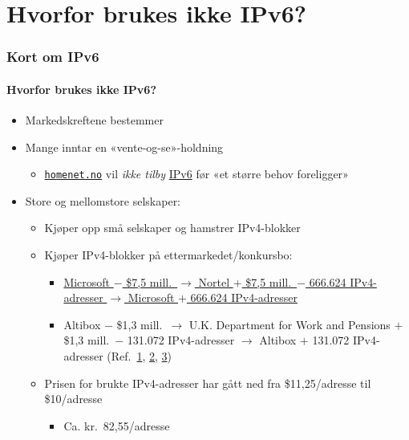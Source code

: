 \section{Hvorfor brukes ikke IPv6?}
\begin{frame}
  \frametitle{Kort om IPv6}
  \framesubtitle{Hvorfor brukes ikke IPv6?}
  \begin{itemize}
  \item Markedskreftene bestemmer
  \item Mange inntar en «vente-og-se»-holdning
    \begin{itemize}
    \item \href{https://homenet.no/}{\texttt{homenet.no}} vil
      \textit{ikke tilby\/}
      \href{https://www.homenet.no/kundeservice}{IPv6}
      før «et større behov foreligger»
    \end{itemize}
  \item Store og mellomstore selskaper:
    \begin{itemize}
    \item Kjøper opp små selskaper og hamstrer IPv4-blokker
    \item Kjøper IPv4-blokker på ettermarkedet/konkursbo:
      \begin{itemize}
      \item
        \href{http://www.computerworld.com/s/article/9215055/Microsoft_offers_7.5M_for_666_624_IPv4_addresses}{Microsoft
          \(-\) \$7,5 mill.\ \(\to\) Nortel \(+\) \$7,5 mill.\ \(-\) 666.624 IPv4-adresser \(\to\) Microsoft \(+\)
          666.624 IPv4-adresser}

      \item Altibox \(-\)
        \$1,3 mill.\ \(\to\)
        U.K. Department for Work and Pensions \(+\)
        \$1,3 mill.\ \(-\)
        131.072 IPv4-adresser \(\to\)
        Altibox \(+\) 131.072 IPv4-adresser
        (Ref.\
        \href{http://www.standard.difi.no/filearchive/samf-ok-analyse-ipv6-v0-8.pdf}{1},
        \href{http://www.digi.no/bedriftsteknologi/2015/05/26/altibox-kjoper-131.072-ip-adresser-fra-england}{2},
        \href{http://www.bbc.com/news/technology-32826353}{3})
      \end{itemize}
    \item Prisen for brukte IPv4-adresser har gått ned fra
      \$11,25/adresse til \$10/adresse
      \begin{itemize}
      \item Ca. kr.~82,55/adresse
      \end{itemize}
    \end{itemize}
  \end{itemize}
\end{frame}

